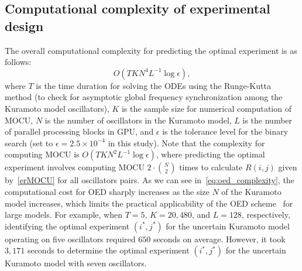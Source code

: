 \documentclass{article}
\newcommand{\be}{\begin{equation}}
\newcommand{\ee}{\end{equation}}
\begin{document}
\subsection{Computational complexity of experimental design}
The overall computational complexity for predicting the optimal experiment is as follows: 
\be
    O(TKN^4L^{-1} \log \epsilon ), \label{eq:oed_complexity}
\ee
where $T$ is the time duration for solving the ODEs using the Runge-Kutta method (to check for asymptotic global frequency synchronization among the Kuramoto model oscillators), $K$ is the sample size for numerical computation of MOCU, $N$ is the number of oscillators in the Kuramoto model, ${L}$ is the number of parallel processing blocks in GPU, and $\epsilon$ is the tolerance level for the binary search (set to $\epsilon = 2.5 \times 10^{-4}$ in this study). Note that the complexity for computing MOCU is $O(TKN^2L^{-1} \log \epsilon)$, where predicting the optimal experiment involves computing MOCU $2 \cdot {N \choose 2}$ times to calculate $R\left(i,j\right)$ given by~\eqref{erMOCU} for all oscillators pairs. As we can see in~\eqref{eq:oed_complexity}, the computational cost for OED sharply increases as the size $N$ of the Kuramoto model increases, which limits the practical applicability of the OED scheme~\cite{Hong2021} for large models. For example, when ${T=5}$, ${K=20,480}$, and ${L=128}$, respectively, identifying the optimal experiment $\left(i^*,j^*\right)$ for the uncertain Kuramoto model operating on five oscillators required ${650}$ seconds on average. However, it took ${3,171}$ seconds to determine the optimal experiment $\left(i^*,j^*\right)$ for the uncertain Kuramoto model with seven oscillators.
\end{document}
